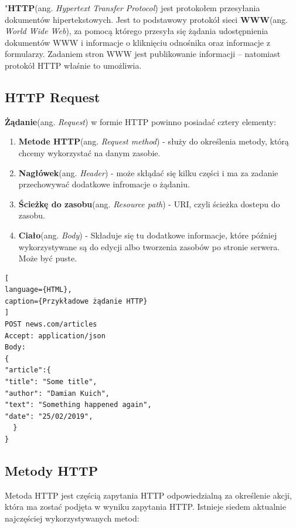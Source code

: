 \documentclass[oneside,polski,logo,indent]{amuthesis}
\begin{document}
"\textbf{HTTP}(ang. \emph{Hypertext Transfer Protocol}) jest protokołem przesyłania dokumentów hipertekstowych. Jest to podstawowy protokół sieci \textbf{WWW}(ang. \emph{World Wide Web}), za pomocą którego przesyła się żądania udostępnienia dokumentów WWW i informacje o kliknięciu odnośnika oraz informacje z formularzy. Zadaniem stron WWW jest publikowanie informacji – natomiast protokół HTTP właśnie to umożliwia.

\begin{center}
\subsection{HTTP Request}
\end{center}
\textbf{Żądanie}(ang. \emph{Request}) w formie HTTP powinno posiadać cztery elementy:
\begin{enumerate}
\item \textbf{Metode HTTP}(ang. \emph{Request method}) - służy do określenia metody, którą chcemy wykorzystać na danym zasobie.
\item \textbf{Nagłówek}(ang. \emph{Header}) - może skłądać się kilku części i ma za zadanie przechowywać dodatkowe infromacje o żądaniu.
\item \textbf{Ścieżkę do zasobu}(ang. \emph{Resource path}) - URI, czyli ścieżka dostepu do zasobu.
\item \textbf{Ciało}(ang. \emph{Body}) - Składuje się tu dodatkowe informacje, które później wykorzystywane są do edycji albo tworzenia zasobów po stronie serwera. Może być puste.
\end{enumerate}


\begin{lstlisting}[
language={HTML},
caption={Przykładowe żądanie HTTP}
]
POST news.com/articles
Accept: application/json
Body:
{
"article":{
"title": "Some title",
"author": "Damian Kuich",
"text": "Something happened again",
"date": "25/02/2019",
  }
}
\end{lstlisting}

\begin{center}
\subsection{Metody HTTP}
\end{center}
Metoda HTTP jest częścią zapytania HTTP odpowiedzialną za określenie akcji, która ma zostać podjęta w wyniku zapytania HTTP. Istnieje siedem aktualnie najczęściej wykorzystywanych metod:
\end{document}
